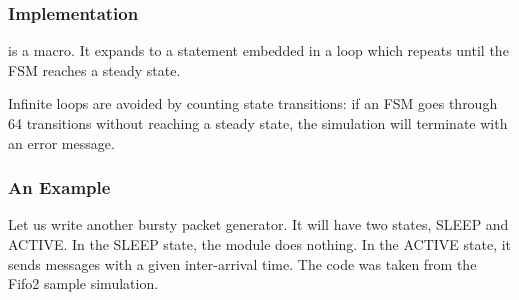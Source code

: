 \subsubsection{Implementation}
\label{sec:simple-modules:fsm-implementation}

 is a macro. It expands to a 
statement embedded in a  loop which repeats until the
FSM reaches a steady state.

Infinite loops are avoided by counting state transitions: if
an FSM goes through 64 transitions without reaching a steady
state, the simulation will terminate with an error message.


\subsubsection{An Example}
\label{sec:simple-modules:fsm-example}

Let us write another bursty packet generator. It will have two
states, SLEEP and ACTIVE. In the SLEEP state, the module does
nothing. In the ACTIVE state, it sends messages with a given
inter-arrival time. The code was taken from the Fifo2 sample
simulation.


